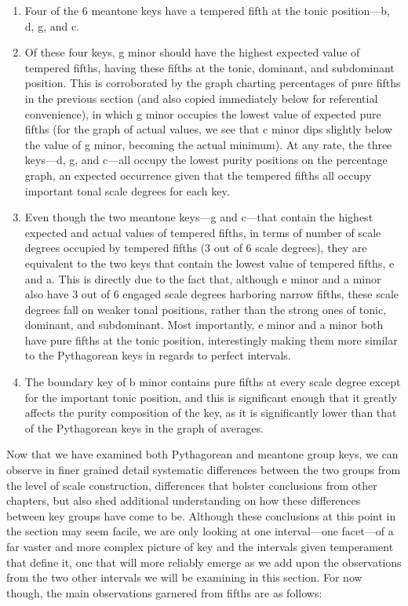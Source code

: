 \begin{enumerate}
\def\labelenumi{\arabic{enumi}.}
\tightlist
\item
  Four of the 6 meantone keys have a tempered fifth at the tonic
  position---b, d, g, and c.
\item
  Of these four keys, g minor should have the highest expected value of
  tempered fifths, having these fifths at the tonic, dominant, and
  subdominant position. This is corroborated by the graph charting
  percentages of pure fifths in the previous section (and also copied
  immediately below for referential convenience), in which g minor
  occupies the lowest value of expected pure fifths (for the graph of
  actual values, we see that c minor dips slightly below the value of g
  minor, becoming the actual minimum). At any rate, the three
  keys---d, g, and c---all occupy the lowest purity positions on
  the percentage graph, an expected occurrence given that the tempered
  fifths all occupy important tonal scale degrees for each key.
\item
  Even though the two meantone keys---g and c---that contain the
  highest expected and actual values of tempered fifths, in terms of
  number of scale degrees occupied by tempered fifths (3 out of 6 scale
  degrees), they are equivalent to the two keys that contain the lowest
  value of tempered fifths, e and a. This is directly due to the fact
  that, although e minor and a minor also have 3 out of 6 engaged scale
  degrees harboring narrow fifths, these scale degrees fall on weaker
  tonal positions, rather than the strong ones of tonic, dominant, and
  subdominant. Most importantly, e minor and a minor both have pure
  fifths at the tonic position, interestingly making them more similar
  to the Pythagorean keys in regards to perfect intervals.
\item
  The boundary key of b minor contains pure fifths at every scale degree
  except for the important tonic position, and this is significant
  enough that it greatly affects the purity composition of the key, as
  it is significantly lower than that of the Pythagorean keys in the
  graph of averages.
\end{enumerate}


    \begin{center}
    \end{center}
    
    Now that we have examined both Pythagorean and meantone group keys, we
can observe in finer grained detail systematic differences between the
two groups from the level of scale construction, differences that
bolster conclusions from other chapters, but also shed additional
understanding on how these differences between key groups have come to
be. Although these conclusions at this point in the section may seem
facile, we are only looking at one interval---one facet---of a
far vaster and more complex picture of key and the intervals given
temperament that define it, one that will more reliably emerge as we add
upon the observations from the two other intervals we will be examining
in this section. For now though, the main observations garnered from
fifths are as follows:

